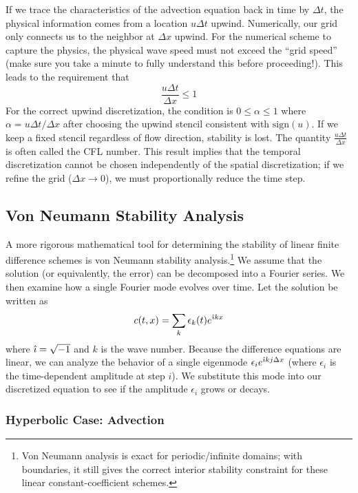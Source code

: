 If we trace the characteristics of the advection equation back in time by $\Delta t$, the physical information comes from a location $u\Delta t$ upwind. Numerically, our grid only connects us to the neighbor at $\Delta x$ upwind. For the numerical scheme to capture the physics, the physical wave speed must not exceed the ``grid speed'' (make sure you take a minute to fully understand this before proceeding!). This leads to the requirement that
\begin{equation}
    \frac{u \Delta t}{\Delta x} \le 1
\end{equation}
For the correct upwind discretization, the condition is $0\le \alpha \le 1$ where $\alpha=u\Delta t/\Delta x$ after choosing the upwind stencil consistent with $\text{sign}(u)$. If we keep a fixed stencil regardless of flow direction, stability is lost. The quantity $\frac{u \Delta t}{\Delta x}$ is often called the CFL number. This result implies that the temporal discretization cannot be chosen independently of the spatial discretization; if we refine the grid ($\Delta x \to 0$), we must proportionally reduce the time step.

\subsection{Von Neumann Stability Analysis}

A more rigorous mathematical tool for determining the stability of linear finite difference schemes is von Neumann stability analysis.\footnote{Von Neumann analysis is exact for periodic/infinite domains; with boundaries, it still gives the correct interior stability constraint for these linear constant-coefficient schemes.} We assume that the solution (or equivalently, the error) can be decomposed into a Fourier series. We then examine how a single Fourier mode evolves over time. Let the solution be written as
\begin{equation}
    c(t,x) = \sum_k \epsilon_k(t) e^{\hat{\imath} kx}
\end{equation}
where $\hat{\imath} = \sqrt{-1}$ and $k$ is the wave number. Because the difference equations are linear, we can analyze the behavior of a single eigenmode $\epsilon_i e^{\hat{\imath} k j \Delta x}$ (where $\epsilon_i$ is the time-dependent amplitude at step $i$). We substitute this mode into our discretized equation to see if the amplitude $\epsilon_i$ grows or decays.

\subsubsection{Hyperbolic Case: Advection}

